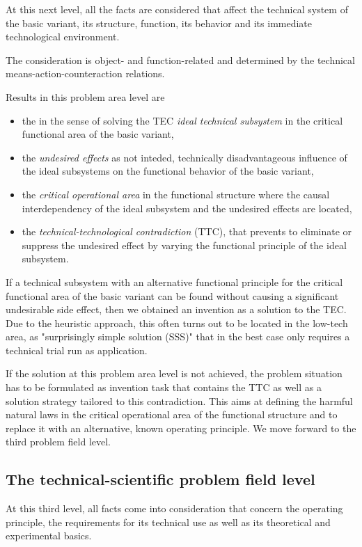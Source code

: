 \documentclass[11pt,a4paper]{article}
\begin{document}
At this next level, all the facts are considered that affect the technical
system of the basic variant, its structure, function, its behavior and its
immediate technological environment.

The consideration is object- and function-related and determined by the
technical means-action-counteraction relations.

Results in this problem area level are
\begin{itemize}
\item the in the sense of solving the TEC \emph{ideal technical subsystem} in
  the critical functional area of the basic variant,
\item the \emph{undesired effects} as not inteded, technically disadvantageous
  influence of the ideal subsystems on the functional behavior of the basic
  variant,
\item the \emph{critical operational area} in the functional structure where
  the causal interdependency of the ideal subsystem and the undesired effects
  are located,
\item the \emph{technical-technological contradiction} (TTC), that prevents to
  eliminate or suppress the undesired effect by varying the functional
  principle of the ideal subsystem.
\end{itemize}
If a technical subsystem with an alternative functional principle for the
critical functional area of the basic variant can be found without causing a
significant undesirable side effect, then we obtained an invention as a
solution to the TEC. Due to the heuristic approach, this often turns out to be
located in the low-tech area, as "surprisingly simple solution (SSS)" that in
the best case only requires a technical trial run as application.

If the solution at this problem area level is not achieved, the problem
situation has to be formulated as invention task that contains the TTC as well
as a solution strategy tailored to this contradiction. This aims at defining
the harmful natural laws in the critical operational area of the functional
structure and to replace it with an alternative, known operating principle.
We move forward to the third problem field level.

\subsection{The technical-scientific problem field level}

At this third level, all facts come into consideration that concern the
operating principle, the requirements for its technical use as well as its
theoretical and experimental basics.
\end{document}
